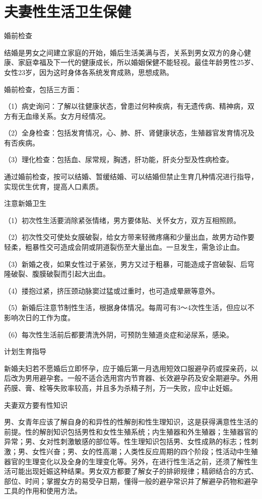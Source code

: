 \documentclass[12pt,UTF8,openany]{ctexbook}
\begin{document}
\chapter{夫妻性生活卫生保健}


婚前检查


结婚是男女之间建立家庭的开始，婚后生活美满与否，关系到男女双方的身心健康、家庭幸福及下一代的健康成长，所以婚姻保健不能轻视。最佳年龄男性25岁、女性23岁，因为这时身体各系统发育成熟，思想成熟。

婚前检查，包括三方面：

（1）病史询问：了解以往健康状态，曾患过何种疾病，有无遗传病、精神病，双方有无血缘关系。女方月经情况。

（2）全身检查：包括发育情况，心、肺、肝、肾健康状态，生殖器官发育情况及有否疾病。

（3）理化检查：包括血、尿常规，胸透，肝功能，肝炎分型及性病检查。

通过婚前检查，按可以结婚、暂缓结婚、可以结婚但禁止生育几种情况进行指导，实现优生优育，提高人口素质。





注意新婚卫生


（1）初次性生活要消除紧张情绪，男方要体贴、关怀女方，双方互相照顾。

（2）初次性交可使处女膜破裂，给女方带来轻微疼痛和少量出血，故男方动作要轻柔，粗暴性交可造成会阴或阴道裂伤至大量出血。一旦发生，需急诊止血。

（3）新婚之夜，如果女性过于紧张，男方又过于粗暴，可能造成子宫破裂、后穹隆破裂、腹膜破裂而引起大出血。

（4）搂抱过紧，挤压颈动脉窦过猛或过重时，也可造成晕厥等意外。

（5）新婚后注意节制性生活，根据身体情况。每周可有3～4次性生活，但应以不影响次日的工作为度。

（6）每次性生活前后都要清洗外阴，可预防生殖道炎症和泌尿系，感染。





计划生育指导


新婚夫妇若不愿婚后立即怀孕，应于婚后第一月选用短效口服避孕药或探亲药，以后改为男用避孕套。一般不适合选用宫内节育器、长效避孕药及安全期避孕。外用药膜、膏、栓等失败率较高，并且多为杀精子剂，万一失败，应中止妊娠。





夫妻双方要有性知识


男、女青年应该了解自身的和异性的性解剖和性生理知识，这是获得满意性生活的前提。性的解剖知识包括男性和女性生殖系统；内生殖器和外生殖器；生殖器官的异常；男、女对性刺激敏感的部位等。性生理知识包括男、女性成熟的标志；性刺激；男、女性兴奋；男、女的性高潮；人类性反应周期的四个阶段；性活动中生殖器官的生理变化以及全身的生理变化等。另外，在进行性生活之前，还须了解性生活可能出现妊娠这种结果。男女双方都要了解女子的排卵规律；精卵结合的方式、部位、时间；掌握女方的易受孕日期，懂得一般的避孕常识并了解避孕药物和避孕工具的作用和使用方法。
\end{document}
